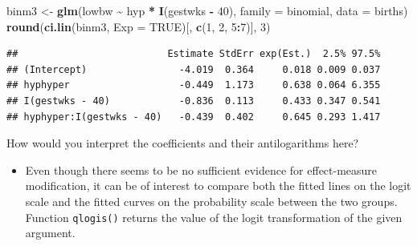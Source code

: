 \documentclass[
]{book}
\newenvironment{Shaded}{\begin{snugshade}}{\end{snugshade}}
\newcommand{\AttributeTok}[1]{\textcolor[rgb]{0.13,0.29,0.53}{#1}}
\newcommand{\ConstantTok}[1]{\textcolor[rgb]{0.56,0.35,0.01}{#1}}
\newcommand{\DecValTok}[1]{\textcolor[rgb]{0.00,0.00,0.81}{#1}}
\newcommand{\FunctionTok}[1]{\textcolor[rgb]{0.13,0.29,0.53}{\textbf{#1}}}
\newcommand{\NormalTok}[1]{#1}
\newcommand{\OtherTok}[1]{\textcolor[rgb]{0.56,0.35,0.01}{#1}}
\newcommand{\SpecialCharTok}[1]{\textcolor[rgb]{0.81,0.36,0.00}{\textbf{#1}}}
\providecommand{\tightlist}{%
  \setlength{\itemsep}{0pt}\setlength{\parskip}{0pt}}
\begin{document}
\begin{Shaded}
\begin{Highlighting}[]
\NormalTok{binm3 }\OtherTok{\textless{}{-}} \FunctionTok{glm}\NormalTok{(lowbw }\SpecialCharTok{\textasciitilde{}}\NormalTok{ hyp }\SpecialCharTok{*} \FunctionTok{I}\NormalTok{(gestwks }\SpecialCharTok{{-}} \DecValTok{40}\NormalTok{), }\AttributeTok{family =}\NormalTok{ binomial, }\AttributeTok{data =}\NormalTok{ births)}
\FunctionTok{round}\NormalTok{(}\FunctionTok{ci.lin}\NormalTok{(binm3, }\AttributeTok{Exp =} \ConstantTok{TRUE}\NormalTok{)[, }\FunctionTok{c}\NormalTok{(}\DecValTok{1}\NormalTok{, }\DecValTok{2}\NormalTok{, }\DecValTok{5}\SpecialCharTok{:}\DecValTok{7}\NormalTok{)], }\DecValTok{3}\NormalTok{)}
\end{Highlighting}
\end{Shaded}

\begin{verbatim}
##                          Estimate StdErr exp(Est.)  2.5% 97.5%
## (Intercept)                -4.019  0.364     0.018 0.009 0.037
## hyphyper                   -0.449  1.173     0.638 0.064 6.355
## I(gestwks - 40)            -0.836  0.113     0.433 0.347 0.541
## hyphyper:I(gestwks - 40)   -0.439  0.402     0.645 0.293 1.417
\end{verbatim}

How would you interpret the coefficients and their antilogarithms here?

\begin{itemize}
\tightlist
\item
  Even though there seems to be no sufficient evidence
  for effect-measure modification, it can be of interest
  to compare both the fitted lines on the logit scale
  and the fitted curves on the probability scale between
  the two groups. Function \texttt{qlogis()} returns the
  value of the logit transformation of the given argument.
\end{itemize}
\end{document}
